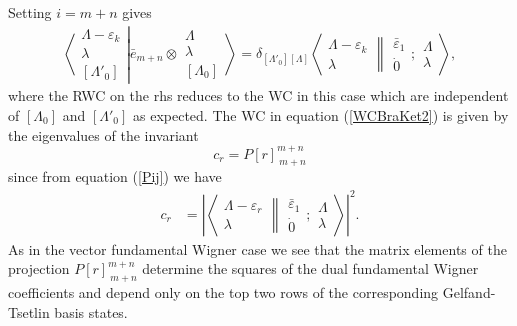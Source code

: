 \documentclass[12pt]{article}
\begin{document}
Setting $i=m+n$ gives
\begin{align}
\left\langle\left. 
\begin{array}{c} \Lambda-\varepsilon_k\\ \lambda \\ {[\Lambda'_0]} \end{array}
\right|\right.
\left.
\bar{e}_{m+n} \otimes \begin{array}{c} \Lambda \\ \lambda \\
{[\Lambda_0]} \end{array}
\right\rangle = \delta_{[\Lambda'_0][\Lambda]}
 \left\langle 
\begin{array}{c} \Lambda-\varepsilon_k\\ \lambda \end{array}
\right\rVert
\left.
\begin{array}{c} 
\bar{\varepsilon}_1 \\ \dot{0}
\end{array}
;
\begin{array}{c} \Lambda \\
\lambda \end{array}
\right\rangle  , \label{WCBraKet2}
\end{align}
where the RWC on the rhs reduces to the WC in this case which are independent of $[\Lambda_0]$ and $[\Lambda'_0]$ as expected. 
The WC in equation (\ref{WCBraKet2}) is given by the eigenvalues of the invariant
$$ 
c_r = P[r]_{\ m+n}^{m+n}
$$
since from equation (\ref{Pij}) we have
\begin{align}
c_r &= \left| \left\langle
\begin{array}{c} \Lambda-\varepsilon_r\\ \lambda \end{array}
\right\rVert
\left.
\begin{array}{c} \bar{\varepsilon}_1 \\
\dot{0} \end{array}  ; \begin{array}{c} \Lambda \\
\lambda \end{array}
\right\rangle \right|^2. \label{WigCoefCUnbar}
\end{align}
As in the vector fundamental Wigner case we see that the matrix elements of the projection  $P[r]_{\ m+n}^{m+n}$ determine
the squares of the dual fundamental Wigner coefficients and depend only on the top two rows of the corresponding Gelfand-Tsetlin basis states.
\end{document}
